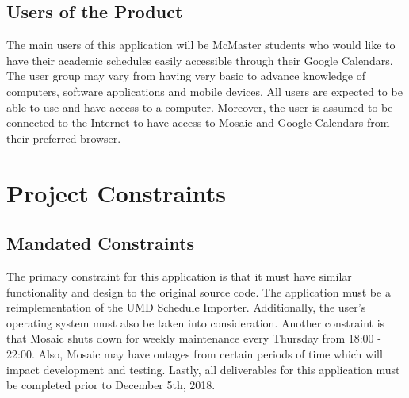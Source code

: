 \documentclass[12pt, titlepage]{article}
\begin{document}
\subsection{Users of the Product}
\hspace{5mm}The main users of this application will be McMaster students who would like to have their academic schedules easily accessible through their Google Calendars. The user group may vary from having very basic to advance knowledge of computers, software applications and mobile devices. All users are expected to be able to use and have access to a computer. Moreover, the user is assumed to be connected to the Internet to have access to Mosaic and Google Calendars from their preferred browser. 

\section{Project Constraints}

\subsection{Mandated Constraints}
\hspace{5mm}The primary constraint for this application is that it must have similar functionality and design to the original source code. The application must be a reimplementation of the UMD Schedule Importer. Additionally, the user's operating system must also be taken into consideration. 
Another constraint is that Mosaic shuts down for weekly maintenance every Thursday from 18:00 - 22:00. Also, Mosaic may have outages from certain periods of time which will impact development and testing. Lastly, all deliverables for this application must be completed prior to December 5th, 2018.
\end{document}

